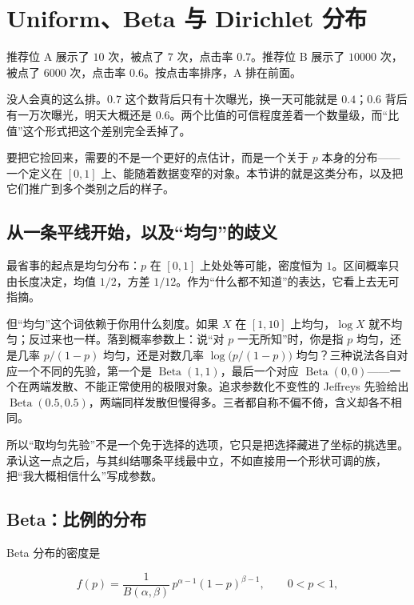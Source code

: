 \section{Uniform、Beta 与 Dirichlet 分布}
\label{sec:05-Probability/06-Common-Distributions/04}

推荐位 A 展示了 \(10\) 次，被点了 \(7\) 次，点击率 \(0.7\)。推荐位 B 展示了 \(10000\) 次，被点了 \(6000\) 次，点击率 \(0.6\)。按点击率排序，A 排在前面。

没人会真的这么排。\(0.7\) 这个数背后只有十次曝光，换一天可能就是 \(0.4\)；\(0.6\) 背后有一万次曝光，明天大概还是 \(0.6\)。两个比值的可信程度差着一个数量级，而``比值''这个形式把这个差别完全丢掉了。

要把它捡回来，需要的不是一个更好的点估计，而是一个关于 \(p\) 本身的分布——一个定义在 \([0,1]\) 上、能随着数据变窄的对象。本节讲的就是这类分布，以及把它们推广到多个类别之后的样子。

\subsection{从一条平线开始，以及``均匀''的歧义}

最省事的起点是均匀分布：\(p\) 在 \([0,1]\) 上处处等可能，密度恒为 \(1\)。区间概率只由长度决定，均值 \(1/2\)，方差 \(1/12\)。作为``什么都不知道''的表达，它看上去无可指摘。

但``均匀''这个词依赖于你用什么刻度。如果 \(X\) 在 \([1,10]\) 上均匀，\(\log X\) 就不均匀；反过来也一样。落到概率参数上：说``对 \(p\) 一无所知''时，你是指 \(p\) 均匀，还是几率 \(p/(1-p)\) 均匀，还是对数几率 \(\log\bigl(p/(1-p)\bigr)\) 均匀？三种说法各自对应一个不同的先验，第一个是 \(\operatorname{Beta}(1,1)\)，最后一个对应 \(\operatorname{Beta}(0,0)\)——一个在两端发散、不能正常使用的极限对象。追求参数化不变性的 Jeffreys 先验给出 \(\operatorname{Beta}(0.5,0.5)\)，两端同样发散但慢得多。三者都自称不偏不倚，含义却各不相同。

所以``取均匀先验''不是一个免于选择的选项，它只是把选择藏进了坐标的挑选里。承认这一点之后，与其纠结哪条平线最中立，不如直接用一个形状可调的族，把``我大概相信什么''写成参数。

\subsection{Beta：比例的分布}

Beta 分布的密度是

\[
f(p)=\frac{1}{B(\alpha,\beta)}\,p^{\alpha-1}(1-p)^{\beta-1},\qquad 0<p<1,
\]

